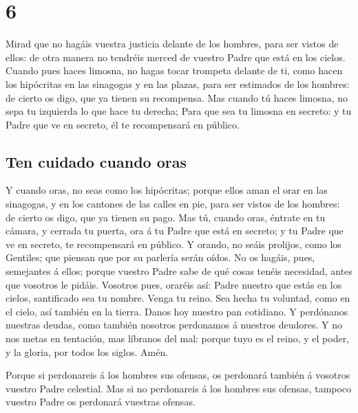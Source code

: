 \hypertarget{section-40-6}{%
\section{6}\label{section-40-6}}

 Mirad que no hagáis vuestra justicia delante de los
hombres, para ser vistos de ellos: de otra manera no tendréis merced de
vuestro Padre que está en los cielos.  Cuando pues haces
limosna, no hagas tocar trompeta delante de ti, como hacen los
hipócritas en las sinagogas y en las plazas, para ser estimados de los
hombres: de cierto os digo, que ya tienen su recompensa. 
Mas cuando tú haces limosna, no sepa tu izquierda lo que hace tu
derecha;  Para que sea tu limosna en secreto: y tu Padre
que ve en secreto, él te recompensará en público.

\hypertarget{ten-cuidado-cuando-oras}{%
\subsection{Ten cuidado cuando oras}\label{ten-cuidado-cuando-oras}}

 Y cuando oras, no seas como los hipócritas; porque ellos
aman el orar en las sinagogas, y en los cantones de las calles en pie,
para ser vistos de los hombres: de cierto os digo, que ya tienen su
pago.  Mas tú, cuando oras, éntrate en tu cámara, y
cerrada tu puerta, ora á tu Padre que está en secreto; y tu Padre que ve
en secreto, te recompensará en público.  Y orando, no
seáis prolijos, como los Gentiles; que piensan que por su parlería serán
oídos.  No os hagáis, pues, semejantes á ellos; porque
vuestro Padre sabe de qué cosas tenéis necesidad, antes que vosotros le
pidáis.  Vosotros pues, oraréis así: Padre nuestro que
estás en los cielos, santificado sea tu nombre.  Venga tu
reino. Sea hecha tu voluntad, como en el cielo, así también en la
tierra.  Danos hoy nuestro pan cotidiano. 
Y perdónanos nuestras deudas, como también nosotros perdonamos á
nuestros deudores.  Y no nos metas en tentación, mas
líbranos del mal: porque tuyo es el reino, y el poder, y la gloria, por
todos los siglos. Amén.

 Porque si perdonareis á los hombres sus ofensas, os
perdonará también á vosotros vuestro Padre celestial. 
Mas si no perdonareis á los hombres sus ofensas, tampoco vuestro Padre
os perdonará vuestras ofensas.

